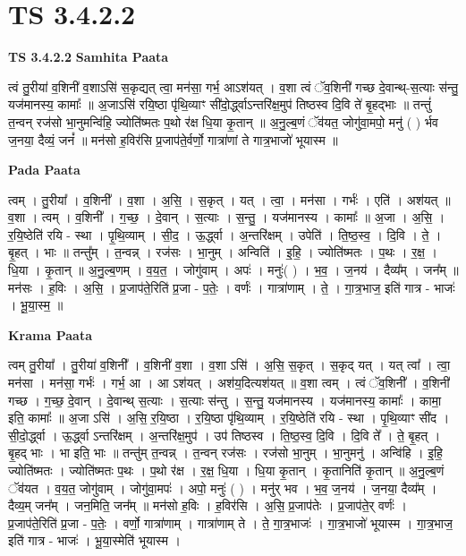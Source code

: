 \documentclass[17pt]{extarticle}
\begin{document}
\section{ TS 3.4.2.2 }

\textbf{TS 3.4.2.2 } \newline
\textbf{Samhita Paata} \newline

त्वं तु॒रीया॑ व॒शिनी॑ व॒शाऽसि॑ स॒कृद्यत् त्वा॒ मन॑सा॒ गर्भ॒ आऽश॑यत् । व॒शा त्वं ॅव॒शिनी॑ गच्छ दे॒वान्थ्-स॒त्याः स॑न्तु॒ यज॑मानस्य॒ कामाः᳚ ॥ अ॒जाऽसि॑ रयि॒ष्ठा पृ॑थि॒व्याꣳ सी॑दो॒र्द्ध्वाऽन्तरि॑क्ष॒मुप॑ तिष्ठस्व दि॒वि ते॑ बृ॒हद्भाः ॥ तन्तुं॑ त॒न्वन् रज॑सो भा॒नुमन्वि॑हि॒ ज्योति॑ष्मतः प॒थो र॑क्ष धि॒या कृ॒तान् ॥ अ॒नु॒ल्ब॒णं ॅव॑यत॒ जोगु॑वा॒मपो॒ मनु॑ ( ) र्भव ज॒नया॒ दैव्यं॒ जनं᳚ ॥ मन॑सो ह॒विर॑सि प्र॒जाप॑ते॒र्वर्णो॒ गात्रा॑णां ते गात्र॒भाजो॑ भूयास्म ॥ \newline

\textbf{Pada Paata} \newline

त्वम् । तु॒रीया᳚ । व॒शिनी᳚ । व॒शा । अ॒सि॒ । स॒कृत् । यत् । त्वा॒ । मन॑सा । गर्भः॑ । एति॑ । अश॑यत् ॥ व॒शा । त्वम् । व॒शिनी᳚ । ग॒च्छ॒ । दे॒वान् । स॒त्याः । स॒न्तु॒ । यज॑मानस्य । कामाः᳚ ॥ अ॒जा । अ॒सि॒ । र॒यि॒ष्ठेति॑ रयि - स्था । पृ॒थि॒व्याम् । सी॒द॒ । ऊ॒र्द्ध्वा । अ॒न्तरि॑क्षम् । उपेति॑ । ति॒ष्ठ॒स्व॒ । दि॒वि । ते॒ । बृ॒हत् । भाः ॥ तन्तु᳚म् । त॒न्वन्न् । रज॑सः । भा॒नुम् । अन्विति॑ । इ॒हि॒ । ज्योति॑ष्मतः । प॒थः । र॒क्ष॒ । धि॒या । कृ॒तान् ॥ अ॒नु॒ल्ब॒णम् । व॒य॒त॒ । जोगु॑वाम् । अपः॑ । मनुः॑( ) । भ॒व॒ । ज॒नय॑ । दैव्य᳚म् । जन᳚म् ॥ मन॑सः । ह॒विः । अ॒सि॒ । प्र॒जाप॑ते॒रिति॑ प्र॒जा - प॒तेः॒ । वर्णः॑ । गात्रा॑णाम् । ते॒ । गा॒त्र॒भाज॒ इति॑ गात्र - भाजः॑ । भू॒या॒स्म॒ ॥  \newline


\textbf{Krama Paata} \newline

त्वम् तु॒रीया᳚ । तु॒रीया॑ व॒शिनी᳚ । व॒शिनी॑ व॒शा । व॒शा ऽसि॑ । अ॒सि॒ स॒कृत् । स॒कृद् यत् । यत् त्वा᳚ । त्वा॒ मन॑सा । मन॑सा॒ गर्भः॑ । गर्भ॒ आ । आ ऽश॑यत् । अश॑य॒दित्यश॑यत् ॥ व॒शा त्वम् । त्वं ॅव॒शिनी᳚ । व॒शिनी॑ गच्छ । ग॒च्छ॒ दे॒वान् । दे॒वान्थ् स॒त्याः । स॒त्याः स॑न्तु । स॒न्तु॒ यज॑मानस्य । यज॑मानस्य॒ कामाः᳚ । कामा॒ इति॒ कामाः᳚ ॥ अ॒जा ऽसि॑ । अ॒सि॒ र॒यि॒ष्ठा । र॒यि॒ष्ठा पृ॑थि॒व्याम् । र॒यि॒ष्ठेति॑ रयि - स्था । पृ॒थि॒व्याꣳ सी॑द । सी॒दो॒र्द्ध्वा । ऊ॒र्द्ध्वा ऽन्तरि॑क्षम् । अ॒न्तरि॑क्ष॒मुप॑ । उप॑ तिष्ठस्व । ति॒ष्ठ॒स्व॒ दि॒वि । दि॒वि ते᳚ । ते॒ बृ॒हत् । बृ॒हद् भाः । भा इति॒ भाः ॥ तन्तु॑म् त॒न्वन्न् । त॒न्वन् रज॑सः । रज॑सो भा॒नुम् । भा॒नुमनु॑ । अन्वि॑हि । इ॒हि॒ ज्योति॑ष्मतः । ज्योति॑ष्मतः प॒थः । प॒थो र॑क्ष । र॒क्ष॒ धि॒या । धि॒या कृ॒तान् । कृ॒तानिति॑ कृ॒तान् ॥ अ॒नु॒ल्ब॒णं ॅव॑यत । व॒य॒त॒ जोगु॑वाम् । जोगु॑वा॒मपः॑ । अपो॒ मनुः॑ ( ) । मनु॑र् भव । भ॒व॒ ज॒नय॑ । ज॒नया॒ दैव्य᳚म् । दैव्य॒म् जन᳚म् । जन॒मिति॒ जन᳚म् ॥ मन॑सो ह॒विः । ह॒विर॑सि । अ॒सि॒ प्र॒जाप॑तेः । प्र॒जाप॑ते॒र् वर्णः॑ । प्र॒जाप॑ते॒रिति॑ प्र॒जा - प॒तेः॒ । वर्णो॒ गात्रा॑णाम् । गात्रा॑णाम् ते । ते॒ गा॒त्र॒भाजः॑ । गा॒त्र॒भाजो॑ भूयास्म । गा॒त्र॒भाज॒ इति॑ गात्र - भाजः॑ । भू॒या॒स्मेति॑ भूयास्म । \newline
\end{document}
